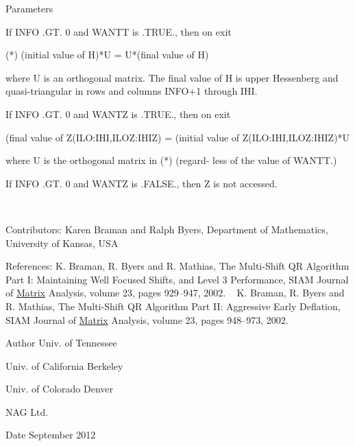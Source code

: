 \begin{DoxyParams}[1]{Parameters}
\begin{DoxyVerb}
                If INFO .GT. 0 and WANTT is .TRUE., then on exit

           (*)  (initial value of H)*U  = U*(final value of H)

                where U is an orthogonal matrix.  The final
                value of H is upper Hessenberg and quasi-triangular
                in rows and columns INFO+1 through IHI.

                If INFO .GT. 0 and WANTZ is .TRUE., then on exit

                  (final value of Z(ILO:IHI,ILOZ:IHIZ)
                   =  (initial value of Z(ILO:IHI,ILOZ:IHIZ)*U

                where U is the orthogonal matrix in (*) (regard-
                less of the value of WANTT.)

                If INFO .GT. 0 and WANTZ is .FALSE., then Z is not
                accessed.\end{DoxyVerb}
 \\
\hline
\end{DoxyParams}
\begin{DoxyParagraph}{Contributors\+: }
Karen Braman and Ralph Byers, Department of Mathematics, University of Kansas, U\+S\+A 
\end{DoxyParagraph}
\begin{DoxyParagraph}{References\+: }
K. Braman, R. Byers and R. Mathias, The Multi-\/\+Shift Q\+R Algorithm Part I\+: Maintaining Well Focused Shifts, and Level 3 Performance, S\+I\+A\+M Journal of \hyperlink{classMatrix}{Matrix} Analysis, volume 23, pages 929--947, 2002. ~\newline
 K. Braman, R. Byers and R. Mathias, The Multi-\/\+Shift Q\+R Algorithm Part I\+I\+: Aggressive Early Deflation, S\+I\+A\+M Journal of \hyperlink{classMatrix}{Matrix} Analysis, volume 23, pages 948--973, 2002. 
\end{DoxyParagraph}
\begin{DoxyAuthor}{Author}
Univ. of Tennessee 

Univ. of California Berkeley 

Univ. of Colorado Denver 

N\+A\+G Ltd. 
\end{DoxyAuthor}
\begin{DoxyDate}{Date}
September 2012 
\end{DoxyDate}

